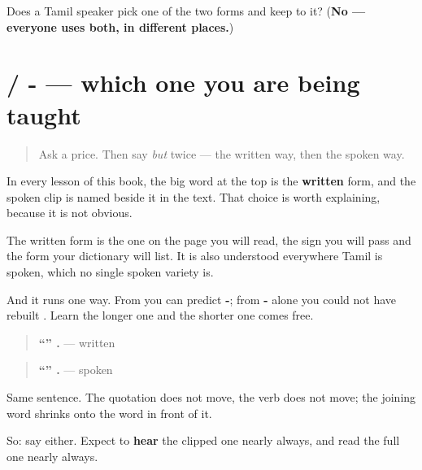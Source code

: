 \begin{tcolorbox}[breakable,colback=teal!4,colframe=teal!35!black,title={Before you move on}]
Does a Tamil speaker pick one of the two forms and keep to it? (\textbf{No — everyone uses both, in different places.})
\end{tcolorbox}
\section[\texorpdfstring{\ta{என்று} / -\ta{ன்னு} (eṉṟu / -ṉṉu)}{என்று / -ன்னு (eṉṟu / -ṉṉu)}]{ / - — which one you are being taught}

\label{lesson:TA-C81-which-tamil}



\begin{quote}
Ask a price. Then say \emph{but} twice — the written way, then the spoken way.
\end{quote}

\begin{grammarlens}[title={Grammar lens: the headword is the written one, on purpose}]
In every lesson of this book, the big word at the top is the \textbf{written} form, and the spoken clip is named beside it in the text. That choice is worth explaining, because it is not obvious.

The written form is the one on the page you will read, the sign you will pass and the form your dictionary will list. It is also understood everywhere Tamil is spoken, which no single spoken variety is.

And it runs one way. From \textbf{} you can predict \textbf{-}; from \textbf{-} alone you could not have rebuilt \textbf{}. Learn the longer one and the shorter one comes free.

\begin{quote}
\textbf{\textquotedblleft{}\textquotedblright{}  .} — written
\end{quote}

\begin{quote}
\textbf{\textquotedblleft{}\textquotedblright{} .} — spoken
\end{quote}

Same sentence. The quotation does not move, the verb does not move; the joining word shrinks onto the word in front of it.

So: say either. Expect to \textbf{hear} the clipped one nearly always, and read the full one nearly always.
\end{grammarlens}

